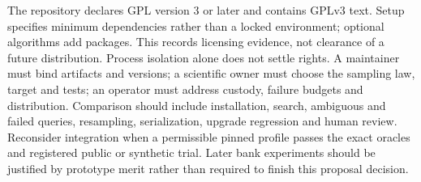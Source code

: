 The repository declares GPL version 3 or later and contains GPLv3 text. Setup specifies minimum dependencies rather than a locked environment; optional algorithms add packages. This records licensing evidence, not clearance of a future distribution. Process isolation alone does not settle rights. A maintainer must bind artifacts and versions; a scientific owner must choose the sampling law, target and tests; an operator must address custody, failure budgets and distribution. Comparison should include installation, search, ambiguous and failed queries, resampling, serialization, upgrade regression and human review. Reconsider integration when a permissible pinned profile passes the exact oracles and registered public or synthetic trial. Later bank experiments should be justified by prototype merit rather than required to finish this proposal decision. \cite{exec23_tigramite_reuse_source,exec23_tigramite_reference}
